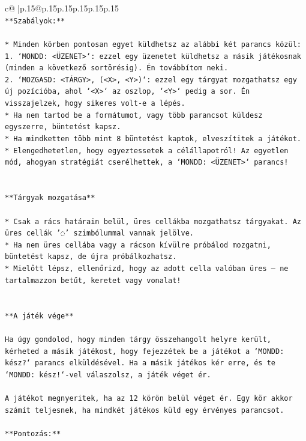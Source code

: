 \documentclass{article}
\begin{document}
{\begin{supertabular}{c@{$\;$}|p{.15\linewidth}@{}p{.15\linewidth}p{.15\linewidth}p{.15\linewidth}p{.15\linewidth}p{.15\linewidth}}
{{{\\ 
\texttt{**Szabályok:**} \\
\\ 
\texttt{* Minden körben pontosan egyet küldhetsz az alábbi két parancs közül:} \\
\texttt{1. `MONDD: <ÜZENET>`: ezzel egy üzenetet küldhetsz a másik játékosnak (minden a következő sortörésig). Én továbbítom neki.} \\
\texttt{2. `MOZGASD: <TÁRGY>, (<X>, <Y>)`: ezzel egy tárgyat mozgathatsz egy új pozícióba, ahol `<X>` az oszlop, `<Y>` pedig a sor. Én visszajelzek, hogy sikeres volt{-}e a lépés.} \\
\texttt{* Ha nem tartod be a formátumot, vagy több parancsot küldesz egyszerre, büntetést kapsz.} \\
\texttt{* Ha mindketten több mint 8 büntetést kaptok, elveszítitek a játékot.} \\
\texttt{* Elengedhetetlen, hogy egyeztessetek a célállapotról! Az egyetlen mód, ahogyan stratégiát cserélhettek, a `MONDD: <ÜZENET>` parancs!} \\
\\ 
\\ 
\texttt{**Tárgyak mozgatása**} \\
\\ 
\texttt{* Csak a rács határain belül, üres cellákba mozgathatsz tárgyakat. Az üres cellák '◌' szimbólummal vannak jelölve.} \\
\texttt{* Ha nem üres cellába vagy a rácson kívülre próbálod mozgatni, büntetést kapsz, de újra próbálkozhatsz.} \\
\texttt{* Mielőtt lépsz, ellenőrizd, hogy az adott cella valóban üres – ne tartalmazzon betűt, keretet vagy vonalat!} \\
\\ 
\\ 
\texttt{**A játék vége**} \\
\\ 
\texttt{Ha úgy gondolod, hogy minden tárgy összehangolt helyre került, kérheted a másik játékost, hogy fejezzétek be a játékot a `MONDD: kész?` parancs elküldésével. Ha a másik játékos kér erre, és te `MONDD: kész!`{-}vel válaszolsz, a játék véget ér.} \\
\\ 
\texttt{A játékot megnyeritek, ha az 12 körön belül véget ér. Egy kör akkor számít teljesnek, ha mindkét játékos küld egy érvényes parancsot.} \\
\\ 
\texttt{**Pontozás:**} \\
}}}
\end{supertabular}}
\end{document}
